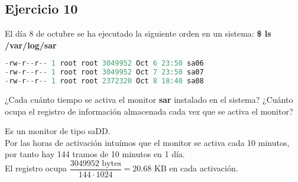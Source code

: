 \subsection{Ejercicio 10}
\noindent
El día 8 de octubre se ha ejecutado la siguiente orden en un sistema: \textbf{\$ ls /var/log/sar}
\begin{lstlisting}[language=C]
-rw-r--r-- 1 root root 3049952 Oct 6 23:50 sa06
-rw-r--r-- 1 root root 3049952 Oct 7 23:50 sa07
-rw-r--r-- 1 root root 2372320 Oct 8 18:40 sa08
\end{lstlisting} 
¿Cada cuánto tiempo se activa el monitor \textbf{sar} instalado en el sistema? ¿Cuánto ocupa el registro de información almacenada cada vez que se activa el monitor?
\begin{tcolorbox}[colback=white,colframe=cyan!50!black,fonttitle=\bfseries]
Es un monitor de tipo saDD.\\
Por las horas de activación intuímos que el monitor se activa cada 10 minutos, por tanto hay 144 tramos de 10 minutos en 1 día.\\

El registro ocupa 
$\dfrac{3049952\text{ bytes}}{144\cdot1024}= 20.68\text{ KB}$ en cada activación.
\end{tcolorbox}